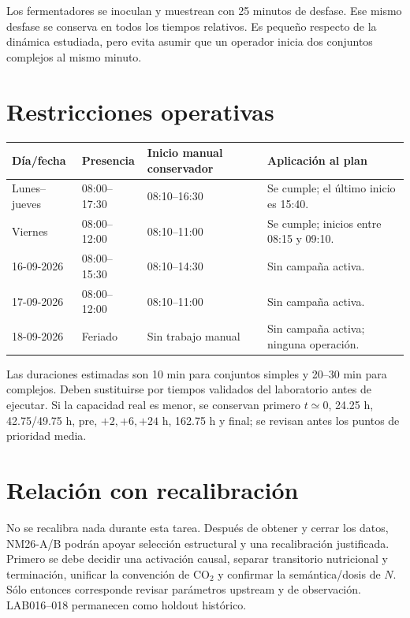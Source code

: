 \documentclass[11pt,a4paper]{article}
\begin{document}
Los fermentadores se inoculan y muestrean con 25 minutos de desfase. Ese mismo
desfase se conserva en todos los tiempos relativos. Es pequeño respecto de la
dinámica estudiada, pero evita asumir que un operador inicia dos conjuntos
complejos al mismo minuto.

\section{Restricciones operativas}

\begin{table}[ht]
\centering
\small
\begin{tabularx}{\textwidth}{@{}l l l Y@{}}
\toprule
Día/fecha & Presencia & Inicio manual conservador & Aplicación al plan\\
\midrule
Lunes--jueves & 08:00--17:30 & 08:10--16:30 & Se cumple; el último inicio es 15:40.\\
Viernes & 08:00--12:00 & 08:10--11:00 & Se cumple; inicios entre 08:15 y 09:10.\\
16-09-2026 & 08:00--15:30 & 08:10--14:30 & Sin campaña activa.\\
17-09-2026 & 08:00--12:00 & 08:10--11:00 & Sin campaña activa.\\
18-09-2026 & Feriado & Sin trabajo manual & Sin campaña activa; ninguna operación.\\
\bottomrule
\end{tabularx}
\end{table}

Las duraciones estimadas son 10 min para conjuntos simples y 20--30 min para
complejos. Deben sustituirse por tiempos validados del laboratorio antes de
ejecutar. Si la capacidad real es menor, se conservan primero \(t\simeq0\), 24.25 h,
42.75/49.75 h, pre, \(+2,+6,+24\) h, 162.75 h y final; se revisan antes los
puntos de prioridad media.

\section{Relación con recalibración}

No se recalibra nada durante esta tarea. Después de obtener y cerrar los datos,
NM26-A/B podrán apoyar selección estructural y una recalibración justificada.
Primero se debe decidir una activación causal, separar transitorio nutricional y
terminación, unificar la convención de CO$_2$ y confirmar la semántica/dosis de
\(N\). Sólo entonces corresponde revisar parámetros upstream y de observación.
LAB016--018 permanecen como holdout histórico.
\end{document}
